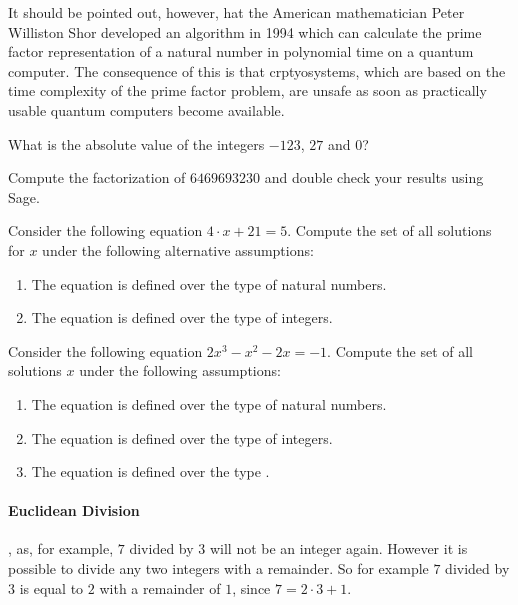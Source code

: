 It should be pointed out, however, hat the American mathematician Peter Williston Shor developed an algorithm in 1994 which can calculate the prime factor representation of a natural number in polynomial time on a quantum computer. The consequence of this is that crptyosystems, which are based on the time complexity of the prime factor problem, are unsafe as soon as practically usable quantum computers become available.  

\begin{exercise}
What is the absolute value of the integers $-123$, $27$ and $0$?
\end{exercise}
\begin{exercise}
Compute the factorization of $6469693230$ and double check your results using Sage.
\end{exercise}
\begin{exercise}
Consider the following equation $4\cdot x + 21 = 5$. Compute the set of all solutions for $x$ under the following alternative assumptions: 
\begin{enumerate}
\item The equation is defined over the type of natural numbers. 
\item The equation is defined over the type of integers.
\end{enumerate}
\end{exercise}
\begin{exercise}
Consider the following equation $2 x^3 - x^2 - 2 x = - 1$. Compute the set of all solutions $x$ under the following assumptions: 
\begin{enumerate}
\item The equation is defined over the type of natural numbers. 
\item The equation is defined over the type of integers.
\item The equation is defined over the type .
\end{enumerate}
\end{exercise}

\paragraph{Euclidean Division}
\label{Euclidean_division}
, as, for example, $7$ divided by $3$ will not be an integer again. However it is possible to divide any two integers with a remainder. So for example $7$ divided by $3$ is equal to $2$ with a remainder of $1$, since $7 = 2\cdot 3 + 1$. 

